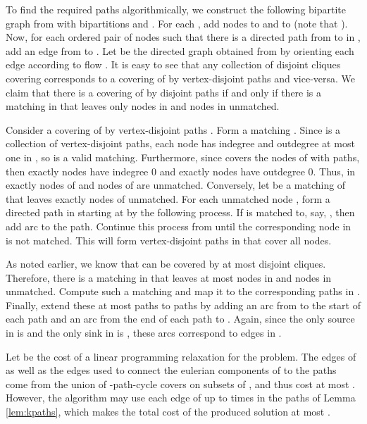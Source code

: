 \documentclass[11pt]{article}
\newcommand{\qed}{\hspace*{\fill}}
\newenvironment{proof}[1][Proof. ]{\noindent {\bf #1 }}{\qed}
\newenvironment{proofof}[1]{\medskip \noindent {\bf{Proof of #1. }}}{\qed}
\begin{document}
\begin{proof}
To find the required paths algorithmically, we construct the following bipartite graph  from  with bipartitions  and . For each , add nodes  to  and  to  (note that ). Now, for each ordered pair of nodes  such that there is a directed path from  to  in , add an edge from  to . Let  be the directed graph obtained from  by orienting each edge  according to flow . It is easy to see that any collection of  disjoint cliques covering  corresponds to a covering of  by  vertex-disjoint paths and vice-versa. We claim that there is a covering of  by  disjoint paths if and only if there is a matching in  that leaves only  nodes in  and  nodes in  unmatched.

Consider a covering of  by  vertex-disjoint paths . Form a matching .
Since  is a collection of vertex-disjoint paths, each node has indegree and outdegree at most one in , so
 is a valid matching. Furthermore, since  covers the nodes of  with  paths, then exactly  nodes
have indegree 0 and exactly  nodes have outdegree 0. Thus, in  exactly  nodes of  and  nodes of  are unmatched.
Conversely, let  be a matching of  that leaves exactly  nodes of  unmatched. For each unmatched node ,
form a directed path in  starting at  by the following process. If  is matched to, say, , then add arc 
to the path. Continue this process from  until the corresponding node in  is not matched. This will
form  vertex-disjoint paths in  that cover all nodes.

As noted earlier, we know that  can be covered by at most  disjoint cliques. Therefore, there is a matching in  that
leaves at most  nodes in  and  nodes in  unmatched. Compute such a matching and map it to the corresponding paths
in . Finally, extend these at most  paths to  paths by adding an arc from  to the start of each path and an arc
from the end of each path to . Again, since the only source in  is  and the only sink in  is , these arcs correspond
to edges in .
\end{proof}

\begin{proofof}{Theorem \ref{thm:kperson}}
Let  be the cost of a linear programming relaxation for the problem. 
The edges of  as well as the edges used to connect the eulerian components of  to the paths come from the union of  -path-cycle covers on subsets of , and thus cost at most . However, the algorithm may use each edge of  up to  times in the paths of Lemma \ref{lem:kpaths}, which makes the total cost of the produced solution at most .
\end{proofof}
\end{document}
